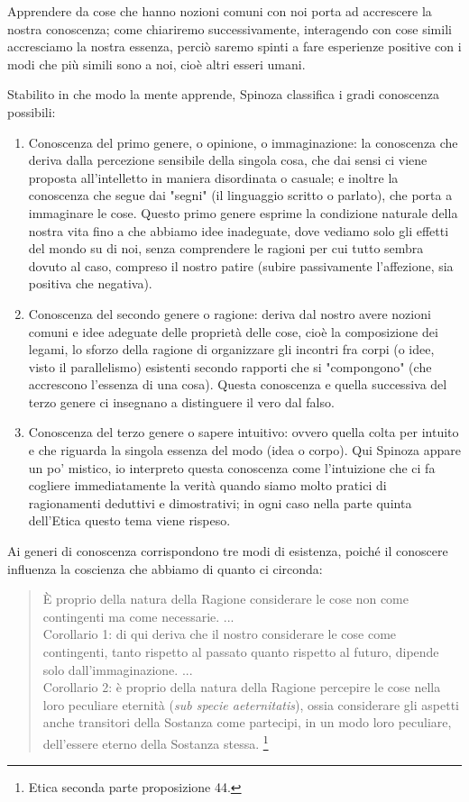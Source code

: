 Apprendere da cose che hanno nozioni comuni con noi porta ad accrescere la nostra conoscenza; come chiariremo successivamente, interagendo con cose simili accresciamo la nostra essenza, perciò saremo spinti a fare esperienze positive con i modi che più simili sono a noi, cioè altri esseri umani.

Stabilito in che modo la mente apprende, Spinoza classifica i gradi conoscenza possibili:
\begin{enumerate}
	\item Conoscenza del primo genere, o opinione, o immaginazione: la conoscenza che deriva dalla percezione sensibile della singola cosa, che dai sensi ci viene proposta all’intelletto in maniera disordinata o casuale; e inoltre la conoscenza che segue dai "segni" (il linguaggio scritto o parlato), che porta a immaginare le cose. Questo primo genere esprime la condizione naturale della nostra vita fino a che abbiamo idee inadeguate, dove vediamo solo gli effetti del mondo su di noi, senza comprendere le ragioni per cui tutto sembra dovuto al caso, compreso il nostro patire (subire passivamente l'affezione, sia positiva che negativa).
	\item Conoscenza del secondo genere o ragione: deriva dal nostro avere nozioni comuni e idee adeguate delle proprietà delle cose, cioè la composizione dei legami, lo sforzo della ragione di organizzare gli incontri fra corpi (o idee, visto il parallelismo) esistenti secondo rapporti che si "compongono" (che accrescono l'essenza di una cosa). Questa conoscenza e quella successiva del terzo genere ci insegnano a distinguere il vero dal falso.
	\item Conoscenza del terzo genere o sapere intuitivo: ovvero quella colta per intuito e che riguarda la singola essenza del modo (idea o corpo). Qui Spinoza appare un po' mistico, io interpreto questa conoscenza come l'intuizione che ci fa cogliere immediatamente la verità quando siamo molto pratici di ragionamenti deduttivi e dimostrativi; in ogni caso nella parte quinta dell'Etica questo tema viene rispeso.
\end{enumerate}

Ai generi di conoscenza corrispondono tre modi di esistenza, poiché  il conoscere influenza la coscienza che abbiamo di quanto ci circonda:

\begin{quotation}
	\small È proprio della natura della Ragione considerare le cose non come contingenti ma come
	necessarie. ...\\
 Corollario 1: di qui deriva che il nostro considerare le cose come contingenti, tanto
	rispetto al passato quanto rispetto al futuro, dipende solo dall’immaginazione. ...\\Corollario 2: è proprio della natura della Ragione percepire le cose nella loro peculiare eternità (\textit{sub specie aeternitatis}), ossia considerare gli aspetti anche transitori della Sostanza come partecipi,
	in un modo loro peculiare, dell’essere eterno della Sostanza stessa.
	\footnote{Etica seconda parte proposizione 44.}
\end{quotation}


